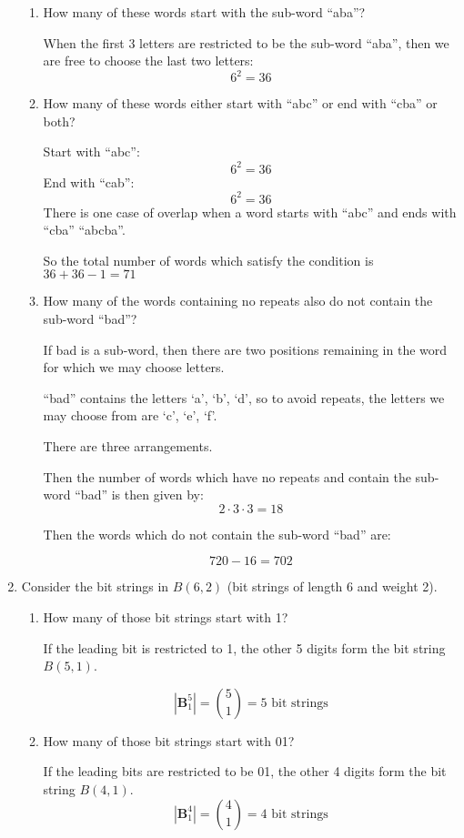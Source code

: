 \documentclass[11pt, letterpaper, includehead]{article}
\theoremstyle{plain}
\theoremstyle{mydefinition}
\theoremstyle{myproperty}
\begin{document}
\begin{enumerate}[label=\textbf{\arabic*}., leftmargin=*]
\begin{enumerate}[label=(\alph*)]
    \item How many of these words start with the sub-word ``aba''?
    
    When the first 3 letters are restricted to be the sub-word ``aba'', then we are free to choose the last two letters:
    \[
    6^2 = 36
    \]
    \item How many of these words either start with ``abc'' or end with ``cba'' or both?
    
    Start with ``abc'':
    \[
    6^2 = 36
    \]
    End with ``cab'':
    \[
    6^2 = 36
    \]
    There is one case of overlap when a word starts with ``abc'' and ends with ``cba'' ``abcba''.

    So the total number of words which satisfy the condition is $36 + 36 - 1 = 71$

    \item How many of the words containing no repeats also do not contain the sub-word ``bad''?
    
    If bad is a sub-word, then there are two positions remaining in the word for which we may choose letters.

    ``bad'' contains the letters `a', `b', `d', so to avoid repeats, the letters we may choose from are `c', `e', `f'.

    There are three arrangements.

    Then the number of words which have no repeats and contain the sub-word ``bad'' is then given by:
    \[2 \cdot 3 \cdot 3 = 18\]

    Then the words which do not contain the sub-word ``bad'' are:

    \[720 - 16 = 702\]
    
\end{enumerate}

\item Consider the bit strings in $B(6,2)$ (bit strings of length 6 and weight 2).
\begin{enumerate}[label=(\alph*)]
    \item How many of those bit strings start with 1?
    
    If the leading bit is restricted to 1, the other 5 digits form the bit string $B(5, 1)$.
    
    \[|\mathbf{B}_1^5| = {5 \choose 1} = 5 \text{ bit strings}\]
    \item How many of those bit strings start with 01?
    
    If the leading bits are restricted to be 01, the other 4 digits form the bit string $B(4, 1)$.
    \[|\mathbf{B}_1^4| = {4 \choose 1} = 4 \text{ bit strings}\]
    

\end{enumerate}
\end{enumerate}
\end{document}
